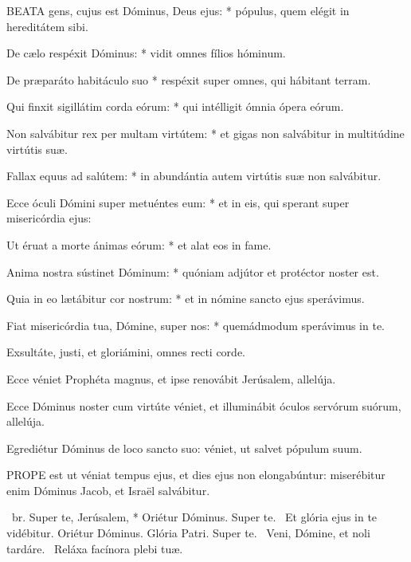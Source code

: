 \lettrine[lines=2]{B}{EATA} gens, cujus est Dóminus, Deus ejus: * pópulus, quem elégit in hereditátem sibi.

De cælo respéxit Dóminus: * vidit omnes fílios hóminum.

De præparáto habitáculo suo * respéxit super omnes, qui hábitant terram.

Qui finxit sigillátim corda eórum: * qui intélligit ómnia ópera eórum.

Non salvábitur rex per multam virtútem: * et gigas non salvábitur in multitúdine virtútis suæ.

Fallax equus ad salútem: * in abundántia autem virtútis suæ non salvábitur.

Ecce óculi Dómini super metuéntes eum: * et in eis, qui sperant super misericórdia ejus:

Ut éruat a morte ánimas eórum: * et alat eos in fame.

Anima nostra sústinet Dóminum: * quóniam adjútor et protéctor noster est.

Quia in eo lætábitur cor nostrum: * et in nómine sancto ejus sperávimus.

Fiat misericórdia tua, Dómine, super nos: * quemádmodum sperávimus in te.

  Exsultáte, justi, et gloriámini, omnes recti corde.


  Ecce véniet Prophéta magnus, et ipse renovábit Jerúsalem, allelúja.

  Ecce Dóminus noster cum virtúte véniet, et illuminábit óculos servórum suórum, allelúja.

  Egrediétur Dóminus de loco sancto suo: véniet, ut salvet pópulum suum.


\lettrine[lines=2]{P}{ROPE} est ut véniat tempus ejus, et dies ejus non elongabúntur: miserébitur enim Dóminus Jacob, et Israël salvábitur.

\R\ br. Super te, Jerúsalem, * Oriétur Dóminus. Super te. \V\ Et glória ejus in te vidébitur. Oriétur Dóminus. Glória Patri. Super te. \V\ Veni, Dómine, et noli tardáre. \R\ Reláxa facínora plebi tuæ.

\label{feria2:precesferialesnona}

